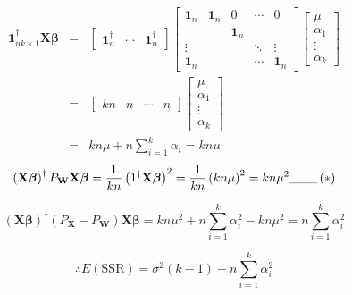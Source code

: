 \documentclass{article}
\begin{document}
\begin{eqnarray*}
\mathbf{1}_{nk\times 1}^{\dagger }\mathbf{X\beta } &\mathbf{=}&\left[ 
\begin{array}{ccc}
\mathbf{1}_{n}^{\dagger } & \mathbf{\cdots } & \mathbf{1}_{n}^{\dagger }%
\end{array}%
\right] \left[ 
\begin{array}{ccccc}
\mathbf{1}_{n} & \mathbf{1}_{n} & 0 & \cdots  & 0 \\ 
&  & \mathbf{1}_{n} &  &  \\ 
\vdots  &  &  & \ddots  & \vdots  \\ 
\mathbf{1}_{n} &  &  & \cdots  & \mathbf{1}_{n}%
\end{array}%
\right] \left[ 
\begin{array}{c}
\mu  \\ 
\alpha _{1} \\ 
\vdots  \\ 
\alpha _{k}%
\end{array}%
\right]  \\
&=&\left[ 
\begin{array}{cccc}
kn & n & \cdots  & n%
\end{array}%
\right] \left[ 
\begin{array}{c}
\mu  \\ 
\alpha _{1} \\ 
\vdots  \\ 
\alpha _{k}%
\end{array}%
\right]  \\
&=&kn\mu +n\sum\limits_{i=1}^{k}\alpha _{i}=kn\mu 
\end{eqnarray*}%
\begin{equation*}
\therefore \left( \mathbf{X\beta }\right) ^{\dagger }P_{\mathbf{W}}\mathbf{%
X\beta }=\frac{1}{kn}\left( 1^{\dagger }\mathbf{X\beta }\right) ^{2}=\frac{1%
}{kn}\left( kn\mu \right) ^{2}=kn\mu ^{2}\mathbf{\_\_\_}\left( \ast \right) 
\end{equation*}

\bigskip 

\begin{equation*}
\left( \mathbf{X\beta }\right) ^{\dagger }\left( P_{\mathbf{X}}-P_{\mathbf{W}%
}\right) \mathbf{X\beta }=kn\mu ^{2}+n\sum_{i=1}^{k}\alpha _{i}^{2}-kn\mu
^{2}=n\sum_{i=1}^{k}\alpha _{i}^{2}
\end{equation*}

\begin{equation*}
\therefore E\left( \text{SSR}\right) =\sigma ^{2}\left( k-1\right)
+n\sum\limits_{i=1}^{k}\alpha _{i}^{2}
\end{equation*}
\end{document}
